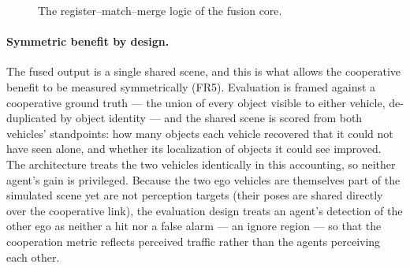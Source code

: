 \begin{figure}[H]
\centering
{}
\caption[The register--match--merge logic of the fusion core]{The
register--match--merge logic of the fusion core.}
\label{fig:fusion}
\end{figure}

\paragraph{Symmetric benefit by design.} The fused output is a single shared
scene, and this is what allows the cooperative benefit to be measured symmetrically
(FR5). Evaluation is framed against a cooperative ground truth --- the union
of every object visible to either vehicle, de-duplicated by object identity --- and
the shared scene is scored from both vehicles' standpoints: how many objects each
vehicle recovered that it could not have seen alone, and whether its localization of
objects it could see improved. The architecture treats the two vehicles identically
in this accounting, so neither agent's gain is privileged. Because the two ego
vehicles are themselves part of the simulated scene yet are not perception
targets (their poses are shared directly over the cooperative link), the
evaluation design treats an agent's detection of the other ego as neither a
hit nor a false alarm --- an ignore region --- so that the cooperation metric
reflects perceived traffic rather than the agents perceiving each other.


